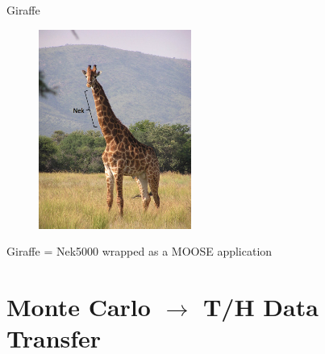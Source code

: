 \documentclass[10pt]{beamer}
\begin{document}
\begin{frame}{Giraffe}

\begin{figure}
\includegraphics[width=5cm]{../Figures/giraffe_nek.png}
\end{figure}

\centering
Giraffe = Nek5000 wrapped as a MOOSE application
\end{frame}

\section{Monte Carlo \(\rightarrow\) T/H Data Transfer}
\end{document}
